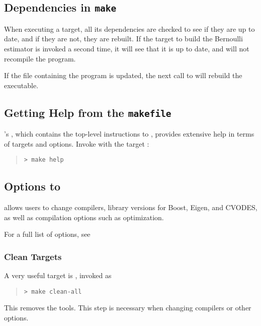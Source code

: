 \subsection{Dependencies in {\tt\bfseries make}}

When executing a  target, all its dependencies are checked
to see if they are up to date, and if they are not, they are rebuilt.
If the  target to build the Bernoulli estimator is invoked
a second time, it will see that it is up to date, and will not
recompile the program.

If the file containing the \Stan program is updated, the next call to
 will rebuild the \CmdStan executable.


\subsection{Getting Help from the {\tt makefile}}

\CmdStan's , which contains the top-level instructions to
, provides extensive help in terms of targets and options. Invoke
 with the target :
%
\begin{quote}
\begin{Verbatim}[fontshape=sl]
> make help
\end{Verbatim}
\end{quote}

\subsection{Options to }

\CmdStan allows users to change compilers, library versions for Boost,
Eigen, and CVODES, as well as compilation options such as
optimization.

For a full list of options, see 



\subsubsection{Clean Targets}

A very useful target is , invoked as
%
\begin{quote}
\begin{Verbatim}[fontshape=sl]
> make clean-all
\end{Verbatim}
\end{quote}
%
This removes the \CmdStan tools. This step is necessary when changing
compilers or other  options.
